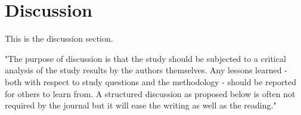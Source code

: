 \section*{Discussion} 
This is the discussion section.

"The purpose of discussion is that the study should be subjected to a critical analysis of the study results
by the authors themselves. Any lessons learned - both with respect to study questions and the
methodology - should be reported for others to learn from.
A structured discussion as proposed below is often not required by the journal but it will ease the
writing as well as the reading."  
